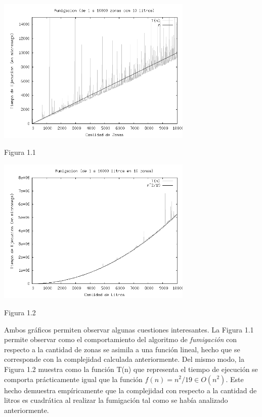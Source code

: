 \documentclass[a4paper,11pt] {article}
\begin{document}
\begin{center}
 \includegraphics[width=0.7\textwidth]{Plots/Tp2Ej1-TiemposFumigacionPorZonas-10litros-bw.png}
\begin{center}
Figura 1.1
\end{center}
 \includegraphics[width=0.7\textwidth]{Plots/Tp2Ej1-TiemposFumigacionPorLitros-10zonas-bw.png}
\begin{center}
Figura 1.2
\end{center}
\end{center}

Ambos gr\'aficos permiten observar algunas cuestiones interesantes. La Figura 1.1 permite observar como el comportamiento del algoritmo de \textit{fumigaci\'on} con respecto a la cantidad de zonas se asimila a una funci\'on lineal, hecho que se corresponde con la complejidad calculada anteriormente. Del mismo modo, la Figura 1.2 muestra como la funci\'on T(n) que representa el tiempo de ejecuci\'on se comporta pr\'acticamente igual que la funci\'on $f(n) = n^2/19 \in O(n^2)$. Este hecho demuestra emp\'iricamente que la complejidad con respecto a la cantidad de litros es cuadr\'atica al realizar la fumigaci\'on tal como se hab\'ia analizado anteriormente.
\end{document}
